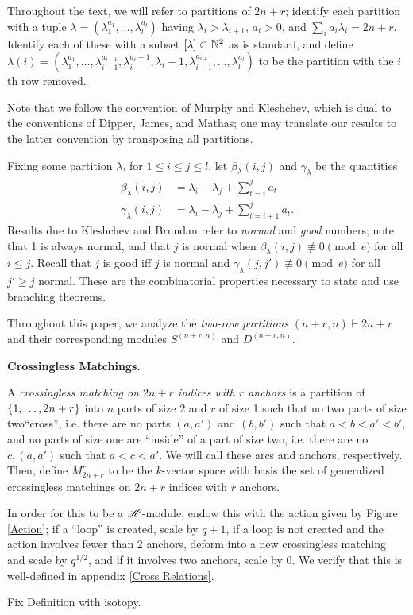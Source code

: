 \documentclass{amsart}
\newcommand{\fakesubsection}[1]{
    \vspace{7pt}
    \noindent \textbf{#1.}
  }
\begin{document}
  \vspace{5pt}
  Throughout the text, we will refer to partitions of $2n + r$;
  identify each partition with a tuple $\lambda = (\lambda_1^{a_1},\dots,\lambda_l^{a_l})$ having $\lambda_i > \lambda_{i+1}$, $a_i > 0$, and $\sum_i a_i\lambda_i = 2n + r$.
  Identify each of these with a subset $\left[ \lambda \right] \subset \mathbb{N}^2$ as is standard, and define $\lambda(i) = (\lambda_1^{a_1},\dots,\lambda_{i-1}^{a_{i-1}},\lambda_i^{a_i - 1},\lambda_i-1,\lambda_{i+1}^{a_{i+1}},\dots,\lambda_l^{a_l})$ to be the partition with the $i$th row removed.\cite{Kleshchev}

  Note that we follow the convention of Murphy and Kleshchev, which is dual to the conventions of Dipper, James, and Mathas;
  one may translate our results to the latter convention by transposing all partitions.\cite{Kleshchev,Mathas-book,Murphy1} 

  Fixing some partition $\lambda$, for $1 \leq i \leq j \leq l$, let $\beta_\lambda(i,j)$ and $\gamma_\lambda$ be the quantities
  \begin{align*}
    \beta_\lambda(i,j) &= \lambda_i - \lambda_j + \sum_{t = i}^j a_t\\
    \gamma_\lambda(i,j) &= \lambda_i - \lambda_j + \sum_{t = i+1}^j a_t.
  \end{align*}
  Results due to Kleshchev and Brundan refer to \emph{normal} and \emph{good} numbers;
  note that 1 is always normal, and that $j$ is normal when $\beta_\lambda(i,j) \not\equiv 0 \pmod e$ for all $i \leq j$.
  Recall that $j$ is good iff $j$ is normal and $\gamma_\lambda(j,j') \not\equiv 0 \pmod e$ for all $j' \geq j$ normal.\cite{Brundan,Kleshchev}
  These are the combinatorial properties necessary to state and use branching theorems.
  
  Throughout this paper, we analyze the \emph{two-row partitions} $(n+r,n) \vdash 2n + r$ and their corresponding modules $S^{(n+r,n)}$ and $D^{(n+r,n)}$.

  \fakesubsection{Crossingless Matchings}

  \begin{definition}
    A \emph{crossingless matching on $2n+r$ indices with $r$ anchors} is a partition of $\left\{ 1,\dots,2n+r \right\}$ into $n$ parts of size $2$ and $r$ of size 1 such that no two parts of size two``cross'', i.e. there are no parts $(a,a')$ and $(b,b')$ such that $a < b < a' < b'$, and no parts of size one are ``inside'' of a part of size two, i.e. there are no $c, (a,a')$ such that $a < c < a'$.
    We will call these arcs and anchors, respectively.
    Then, define $M^r_{2n+r}$ to be the $k$-vector space with basis the set of generalized crossingless matchings on $2n+r$ indices with $r$ anchors.

    In order for this to be a $\mathscr{H}$-module, endow this with the action given by Figure \ref{Action}; 
    if a ``loop'' is created, scale by $q+1$, if a loop is not created and the action involves fewer than 2 anchors, deform into a new crossingless matching and scale by $q^{1/2}$, and if it involves two anchors, scale by 0.
    We verify that this is well-defined in appendix \ref{Cross Relations}.
  \end{definition}
  {\color{orange} Fix Definition with isotopy.}
\end{document}
